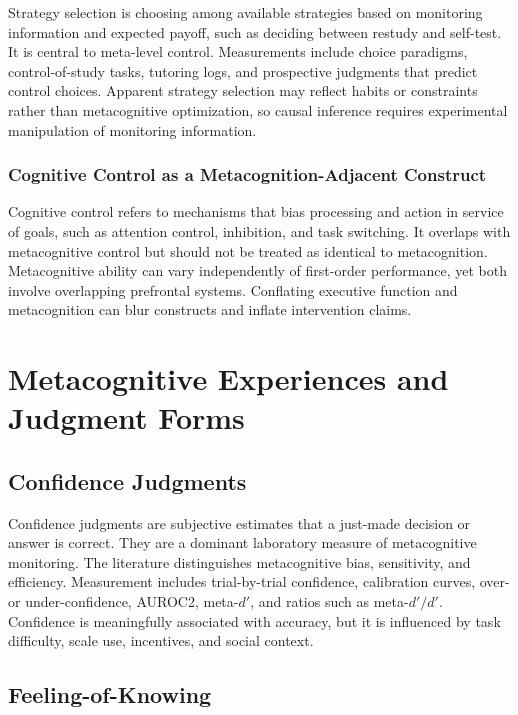 \documentclass[a4paper]{article}
\begin{document}
   Strategy selection is choosing among available strategies based on monitoring information and expected payoff, such as deciding between restudy and self-test. It is central to meta-level control. Measurements include choice paradigms, control-of-study tasks, tutoring logs, and prospective judgments that predict control choices. Apparent strategy selection may reflect habits or constraints rather than metacognitive optimization, so causal inference requires experimental manipulation of monitoring information.

   \subsubsection{Cognitive Control as a Metacognition-Adjacent Construct}

   Cognitive control refers to mechanisms that bias processing and action in service of goals, such as attention control, inhibition, and task switching. It overlaps with metacognitive control but should not be treated as identical to metacognition. Metacognitive ability can vary independently of first-order performance, yet both involve overlapping prefrontal systems. Conflating executive function and metacognition can blur constructs and inflate intervention claims.

   \section{Metacognitive Experiences and Judgment Forms}

   \subsection{Confidence Judgments}

   Confidence judgments are subjective estimates that a just-made decision or answer is correct. They are a dominant laboratory measure of metacognitive monitoring. The literature distinguishes metacognitive bias, sensitivity, and efficiency. Measurement includes trial-by-trial confidence, calibration curves, over- or under-confidence, AUROC2, meta-$d'$, and ratios such as meta-$d'/d'$. Confidence is meaningfully associated with accuracy, but it is influenced by task difficulty, scale use, incentives, and social context.

   \subsection{Feeling-of-Knowing}
\end{document}
